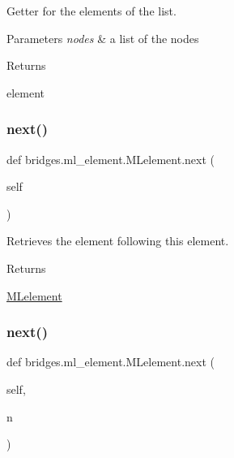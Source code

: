 Getter for the elements of the list. 


\begin{DoxyParams}{Parameters}
{\em nodes} & a list of the nodes \\
\hline
\end{DoxyParams}
\begin{DoxyReturn}{Returns}


element 
\end{DoxyReturn}
\mbox{\label{classbridges_1_1ml__element_1_1_m_lelement_a951d30261514e6eaefdd7d60f1c77f73}} 
\subsubsection{\texorpdfstring{next()}{next()}\hspace{0.1cm}{\footnotesize\ttfamily [1/2]}}
{\footnotesize\ttfamily def bridges.\+ml\+\_\+element.\+M\+Lelement.\+next (\begin{DoxyParamCaption}\item[{}]{self }\end{DoxyParamCaption})}



Retrieves the element following this element. 

\begin{DoxyReturn}{Returns}


\mbox{\hyperlink{classbridges_1_1ml__element_1_1_m_lelement}{M\+Lelement}} 
\end{DoxyReturn}
\mbox{\label{classbridges_1_1ml__element_1_1_m_lelement_a588b700bb42eb43ce3993f9715497deb}} 
\subsubsection{\texorpdfstring{next()}{next()}\hspace{0.1cm}{\footnotesize\ttfamily [2/2]}}
{\footnotesize\ttfamily def bridges.\+ml\+\_\+element.\+M\+Lelement.\+next (\begin{DoxyParamCaption}\item[{}]{self,  }\item[{}]{n }\end{DoxyParamCaption})}

